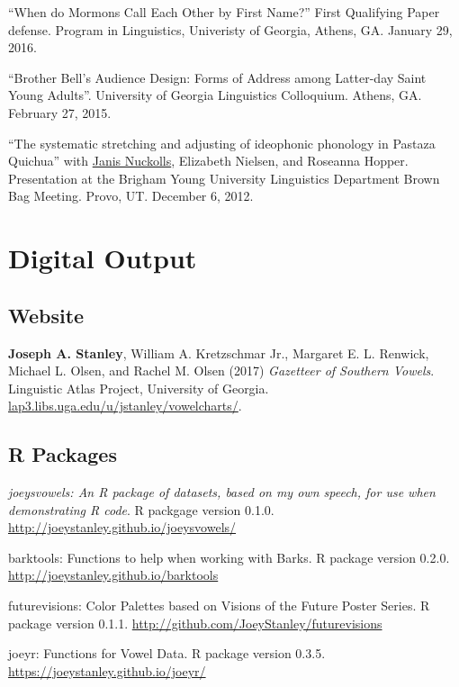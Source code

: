 \documentclass[
]{article}
\begin{document}
``When do Mormons Call Each Other by First Name?'' First Qualifying
Paper defense. Program in Linguistics, Univeristy of Georgia, Athens,
GA. January 29, 2016.

``Brother Bell's Audience Design: Forms of Address among Latter-day
Saint Young Adults''. University of Georgia Linguistics Colloquium.
Athens, GA. February 27, 2015.

``The systematic stretching and adjusting of ideophonic phonology in
Pastaza Quichua'' with
\href{https://hum.byu.edu/directory/janis-nuckolls}{Janis Nuckolls},
Elizabeth Nielsen, and Roseanna Hopper. Presentation at the Brigham
Young University Linguistics Department Brown Bag Meeting. Provo, UT.
December 6, 2012.

\hypertarget{digital-output}{%
\section{Digital Output}\label{digital-output}}

\hypertarget{website}{%
\subsection{Website}\label{website}}

\textbf{Joseph A. Stanley}, William A. Kretzschmar Jr., Margaret E. L.
Renwick, Michael L. Olsen, and Rachel M. Olsen (2017) \emph{Gazetteer of
Southern Vowels}. Linguistic Atlas Project, University of Georgia.
\href{http://lap3.libs.uga.edu/u/jstanley/vowelcharts/}{lap3.libs.uga.edu/u/jstanley/vowelcharts/}.

\hypertarget{r-packages}{%
\subsection{R Packages}\label{r-packages}}

\emph{joeysvowels: An R package of datasets, based on my own speech, for
use when demonstrating R code}. R packgage version 0.1.0.
\url{http://joeystanley.github.io/joeysvowels/}

barktools: Functions to help when working with Barks. R package version
0.2.0. \url{http://joeystanley.github.io/barktools}

futurevisions: Color Palettes based on Visions of the Future Poster
Series. R package version 0.1.1.
\url{http://github.com/JoeyStanley/futurevisions}

joeyr: Functions for Vowel Data. R package version 0.3.5.
\url{https://joeystanley.github.io/joeyr/}
\end{document}
